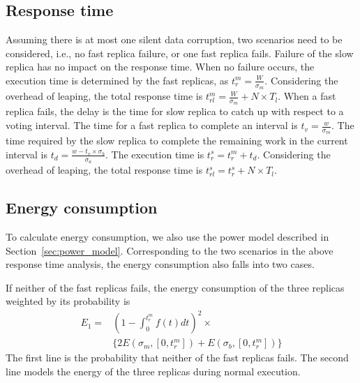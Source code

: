 \subsection{Response time}
Assuming there is at most one silent data corruption, two scenarios need to be considered, i.e., no fast replica failure, or one fast replica fails. Failure of the slow replica has no impact on the response time. 
When no failure occurs, the execution time is determined by the fast replicas, as $t_r^m=\frac{W}{\sigma_m}$. Considering the overhead of leaping, the total response time is $t_{rl}^m=\frac{W}{\sigma_m} + N \times T_l$.
When a fast replica fails, the delay is the time for slow replica to catch up with respect to a voting interval. The time for a fast replica to complete an interval is $t_v = \frac{w}{\sigma_m}$. The time required by the slow replica to complete the remaining work in the current interval is $t_d = \frac{w - t_v\times \sigma_b}{\sigma_a}$. The execution time is $t_r^s = t_r^m + t_d$. Considering the overhead of leaping, the total response time is $t_{rl}^s=t_r^s + N \times T_l$.



\subsection{Energy consumption}
To calculate energy consumption, we also use the power model described in Section~\ref{sec:power_model}.
Corresponding to the two scenarios in the above response time analysis, the energy consumption also falls into two cases. 

If neither of the fast replicas fails, the energy consumption of the three replicas weighted by its probability is
\begin{equation}
\begin{split}
E_1 = & (1 - \int_{0}^{t_r^m} f(t)dt)^2  \times \\
      & \{2E(\sigma_m, [0, t_r^m])+E(\sigma_b, [0, t_r^m])\}
\end{split}
\end{equation}
The first line is the probability that neither of the fast replicas fails. The second line models the energy of the three replicas during normal execution.

